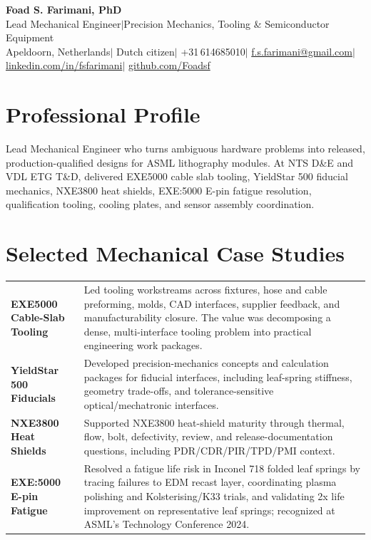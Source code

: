 \documentclass[11pt,a4paper]{article}
\begin{document}
\begin{center}
 {\LARGE\bfseries Foad S. Farimani, PhD} \\[4pt]
 {\small Lead Mechanical Engineer\enspace$\mid$\enspace Precision Mechanics, Tooling \& Semiconductor Equipment}
 \\[6pt]
 {\small
  Apeldoorn, Netherlands\enspace$\mid$\enspace
  Dutch citizen\enspace$\mid$\enspace
  +31\,614685010\enspace$\mid$\enspace
  \href{mailto:f.s.farimani@gmail.com}{f.s.farimani@gmail.com}\enspace$\mid$\enspace
  \href{https://linkedin.com/in/fsfarimani}{linkedin.com/in/fsfarimani}\enspace$\mid$\enspace
  \href{https://github.com/Foadsf}{github.com/Foadsf}
 }
\end{center}

\section{Professional Profile}
Lead Mechanical Engineer who turns ambiguous hardware problems into released, production-qualified designs for ASML lithography modules. At NTS D\&E and VDL ETG T\&D, delivered EXE5000 cable slab tooling, YieldStar 500 fiducial mechanics, NXE3800 heat shields, EXE:5000 E-pin fatigue resolution, qualification tooling, cooling plates, and sensor assembly coordination.

\section{Selected Mechanical Case Studies}

\begin{tabularx}{\textwidth}{@{}p{}X@{}}
\textbf{EXE5000 Cable-Slab Tooling} &
Led tooling workstreams across fixtures, hose and cable preforming, molds, CAD interfaces, supplier feedback, and manufacturability closure. The value was decomposing a dense, multi-interface tooling problem into practical engineering work packages. \\[4pt]
\textbf{YieldStar 500 Fiducials} &
Developed precision-mechanics concepts and calculation packages for fiducial interfaces, including leaf-spring stiffness, geometry trade-offs, and tolerance-sensitive optical/mechatronic interfaces. \\[4pt]
\textbf{NXE3800 Heat Shields} &
Supported NXE3800 heat-shield maturity through thermal, flow, bolt, defectivity, review, and release-documentation questions, including PDR/CDR/PIR/TPD/PMI context. \\[4pt]
\textbf{EXE:5000 E-pin Fatigue} &
Resolved a fatigue life risk in Inconel 718 folded leaf springs by tracing failures to EDM recast layer, coordinating plasma polishing and Kolsterising/K33 trials, and validating 2x life improvement on representative leaf springs; recognized at ASML's Technology Conference 2024. \\
\end{tabularx}
\end{document}
